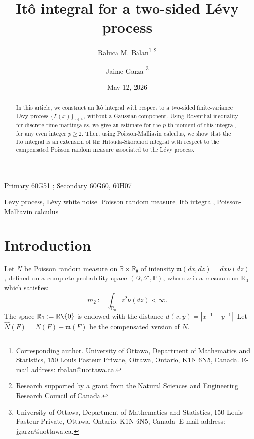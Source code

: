\documentclass[12pt]{article}
\def\cF{\mathcal{F}}
\def\bP{\mathbb{P}}
\def\bR{\mathbb{R}}
\newcommand{\fm}{\mathfrak{m}}
\begin{document}
\title{It\^o integral for a two-sided L\'evy process}

\author{Raluca M. Balan\footnote{Corresponding author. University of Ottawa, Department of Mathematics and Statistics, 150 Louis Pasteur Private, Ottawa, Ontario, K1N 6N5, Canada. E-mail address: rbalan@uottawa.ca.} \footnote{Research supported by a grant from the Natural Sciences and Engineering Research Council of Canada.}
\and
Jaime Garza \footnote{University of Ottawa, Department of Mathematics and Statistics, 150 Louis Pasteur Private, Ottawa, Ontario, K1N 6N5, Canada. E-mail address: jgarza@uottawa.ca.}
}

\date{May 12, 2026}
\maketitle


\begin{abstract}
\noindent In this article, we construct an It\^o integral with respect to a two-sided finite-variance L\'evy process $\{L(x)\}_{x\in \bR}$, without a Gaussian component.  Using Rosenthal inequality for discrete-time martingales, we give an estimate for the $p$-th moment of this integral, for any even integer $p\geq 2$. Then, using Poisson-Malliavin calculus, we show that the It\^o integral is an extension of the Hitsuda-Skorohod integral with respect to the compensated Poisson random measure associated to the L\'evy process.
\end{abstract}


 Primary 60G51 ; Secondary 60G60, 60H07


\vspace{1mm}

 L\'evy process, L\'evy white noise, Poisson random measure, It\^o integral, Poisson-Malliavin calculus






\section{Introduction}


Let $N$ be Poisson random measure on $\bR \times \bR_0$ of intensity $\fm(dx,dz)=dx \nu(dz)$,
defined on a complete probability space $(\Omega,\cF,\bP)$, where $\nu$ is a measure on $\bR_0$ which satisfies:
\[
m_2:=\int_{\bR_0}z^2 \nu(dz)<\infty.
\]
The space $\bR_0:=\bR \verb2\2 \{0\}$ is endowed with the distance $d(x,y)=|x^{-1}-y^{-1}|$. Let $\widehat{N}(F)=N(F)-\fm(F)$ be the compensated version of $N$. 
\end{document}
